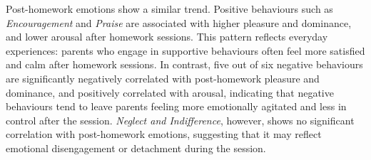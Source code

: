 
Post-homework emotions show a similar trend. Positive behaviours such as \textit{Encouragement} and \textit{Praise} are associated with higher pleasure and dominance, and lower arousal after homework sessions.  This pattern reflects everyday experiences: parents who engage in supportive behaviours often feel more satisfied and calm after homework sessions. In contrast, five out of six negative behaviours are significantly negatively correlated with post-homework pleasure and dominance, and positively correlated with arousal, indicating that negative behaviours tend to leave parents feeling more emotionally agitated and less in control after the session. \textit{Neglect and Indifference}, however, shows no significant correlation with post-homework emotions, suggesting that it may reflect emotional disengagement or detachment during the session.


